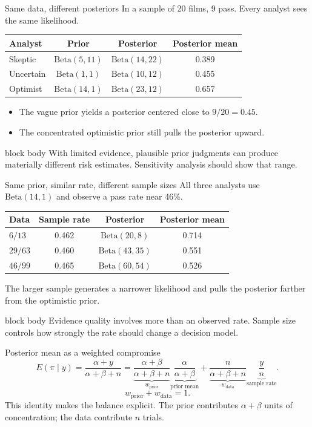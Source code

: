 \documentclass[aspectratio=43,11pt]{beamer}
\newcommand{\riskbox}[1]{\begin{beamercolorbox}[rounded=true,sep=.8em]{block body} #1\end{beamercolorbox}}
\begin{document}
\begin{frame}{Same data, different posteriors}
In a sample of 20 films, 9 pass. Every analyst sees the same likelihood.
\begin{center}
\begin{tabular}{lccc}
\toprule
Analyst & Prior & Posterior & Posterior mean \\
\midrule
Skeptic & $\mathrm{Beta}(5,11)$ & $\mathrm{Beta}(14,22)$ & 0.389 \\
Uncertain & $\mathrm{Beta}(1,1)$ & $\mathrm{Beta}(10,12)$ & 0.455 \\
Optimist & $\mathrm{Beta}(14,1)$ & $\mathrm{Beta}(23,12)$ & 0.657 \\
\bottomrule
\end{tabular}
\end{center}
\begin{itemize}
  \item The vague prior yields a posterior centered close to $9/20=0.45$.
  \item The concentrated optimistic prior still pulls the posterior upward.
\end{itemize}
\riskbox{With limited evidence, plausible prior judgments can produce materially different risk estimates. Sensitivity analysis should show that range.}
\end{frame}

\begin{frame}{Same prior, similar rate, different sample sizes}
All three analysts use $\mathrm{Beta}(14,1)$ and observe a pass rate near 46\%.
\begin{center}
\begin{tabular}{lccc}
\toprule
Data & Sample rate & Posterior & Posterior mean \\
\midrule
$6/13$ & 0.462 & $\mathrm{Beta}(20,8)$ & 0.714 \\
$29/63$ & 0.460 & $\mathrm{Beta}(43,35)$ & 0.551 \\
$46/99$ & 0.465 & $\mathrm{Beta}(60,54)$ & 0.526 \\
\bottomrule
\end{tabular}
\end{center}
The larger sample generates a narrower likelihood and pulls the posterior farther from the optimistic prior.
\riskbox{Evidence quality involves more than an observed rate. Sample size controls how strongly the rate should change a decision model.}
\end{frame}

\begin{frame}{Posterior mean as a weighted compromise}
\[
E(\pi\mid y)=\frac{\alpha+y}{\alpha+\beta+n}
=\underbrace{\frac{\alpha+\beta}{\alpha+\beta+n}}_{w_{\text{prior}}}
\underbrace{\frac{\alpha}{\alpha+\beta}}_{\text{prior mean}}
+\underbrace{\frac{n}{\alpha+\beta+n}}_{w_{\text{data}}}
\underbrace{\frac{y}{n}}_{\text{sample rate}}.
\]
\[
w_{\text{prior}}+w_{\text{data}}=1.
\]
This identity makes the balance explicit. The prior contributes $\alpha+\beta$ units of concentration; the data contribute $n$ trials.
\end{frame}
\end{document}

